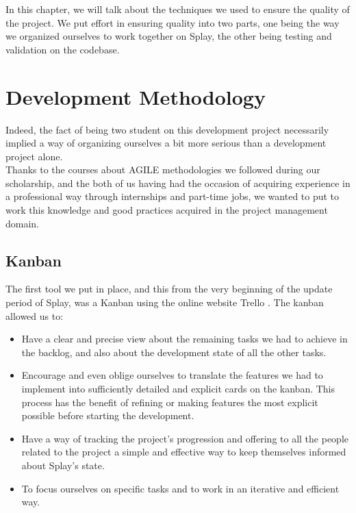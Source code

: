\documentclass{eplmastersthesis}
\begin{document}
    In this chapter, we will talk about the techniques we used to ensure the
    quality of the project. We put effort in ensuring quality into two
    parts, one being the way we organized ourselves to work together on Splay,
    the other being testing and validation on the codebase.

    \section{Development Methodology}

      Indeed, the fact of being two student on this development project necessarily
      implied a way of organizing ourselves a bit more serious than a
      development project alone.\\

      Thanks to the courses about AGILE methodologies we followed during our
      scholarship, and the both of us having had the occasion of acquiring
      experience in a professional way through internships and part-time jobs,
      we wanted to put to work this knowledge and good practices acquired in
      the project management domain.

        \subsection{Kanban}

          The first tool we put in place, and this from the very beginning of
          the update period of Splay, was a Kanban using the online website
          Trello \cite{trello}. The kanban allowed us to: \\

          \begin{itemize}
            \item Have a clear and precise view about the remaining tasks we had
            to achieve in the backlog, and also about the development state of
            all the other tasks.
            \item Encourage and even oblige ourselves to translate the features
            we had to implement into sufficiently detailed and explicit cards on
            the kanban. This process has the benefit of refining or making
            features the most explicit possible before starting the development.
            \item Have a way of tracking the project's progression and offering
            to all the people related to the project a simple and effective way
            to keep themselves informed about Splay's state.
            \item To focus ourselves on specific tasks and to work in an
            iterative and efficient way.
          \end{itemize}
\end{document}
